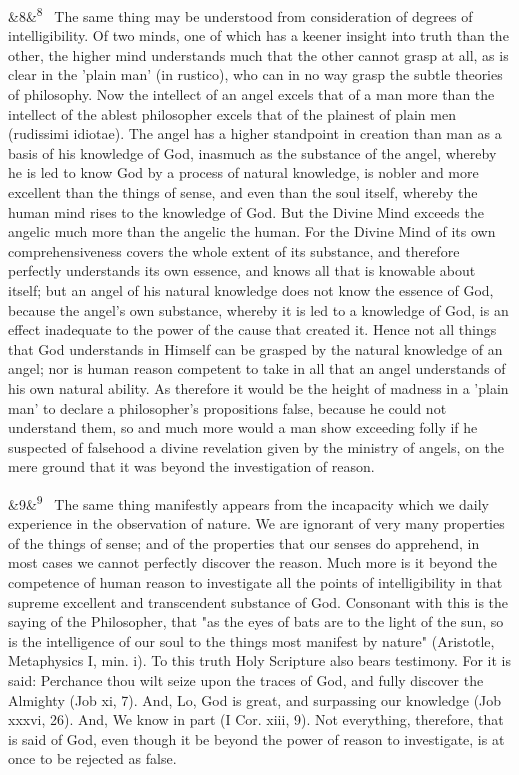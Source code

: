 \documentclass[12pt]{article}
\newcommand{\para}[1][]{\par\noindent\ifx&#1&\else\textsuperscript{\footnotesize #1}~\fi}
\begin{document}
\para[8] The same thing may be understood from consideration of degrees of intelligibility. Of two minds, one of which has a keener insight into truth than the other, the higher mind understands much that the other cannot grasp at all, as is clear in the 'plain man' (in rustico), who can in no way grasp the subtle theories of philosophy. Now the intellect of an angel excels that of a man more than the intellect of the ablest philosopher excels that of the plainest of plain men (rudissimi idiotae). The angel has a higher standpoint in creation than man as a basis of his knowledge of God, inasmuch as the substance of the angel, whereby he is led to know God by a process of natural knowledge, is nobler and more excellent than the things of sense, and even than the soul itself, whereby the human mind rises to the knowledge of God. But the Divine Mind exceeds the angelic much more than the angelic the human. For the Divine Mind of its own comprehensiveness covers the whole extent of its substance, and therefore perfectly understands its own essence, and knows all that is knowable about itself; but an angel of his natural knowledge does not know the essence of God, because the angel's own substance, whereby it is led to a knowledge of God, is an effect inadequate to the power of the cause that created it. Hence not all things that God understands in Himself can be grasped by the natural knowledge of an angel; nor is human reason competent to take in all that an angel understands of his own natural ability. As therefore it would be the height of madness in a 'plain man' to declare a philosopher's propositions false, because he could not understand them, so and much more would a man show exceeding folly if he suspected of falsehood a divine revelation given by the ministry of angels, on the mere ground that it was beyond the investigation of reason.

\para[9] The same thing manifestly appears from the incapacity which we daily experience in the observation of nature. We are ignorant of very many properties of the things of sense; and of the properties that our senses do apprehend, in most cases we cannot perfectly discover the reason. Much more is it beyond the competence of human reason to investigate all the points of intelligibility in that supreme excellent and transcendent substance of God. Consonant with this is the saying of the Philosopher, that "as the eyes of bats are to the light of the sun, so is the intelligence of our soul to the things most manifest by nature" (Aristotle, Metaphysics I, min. i). To this truth Holy Scripture also bears testimony. For it is said: Perchance thou wilt seize upon the traces of God, and fully discover the Almighty (Job xi, 7). And, Lo, God is great, and surpassing our knowledge (Job xxxvi, 26). And, We know in part (I Cor. xiii, 9). Not everything, therefore, that is said of God, even though it be beyond the power of reason to investigate, is at once to be rejected as false.
\end{document}
